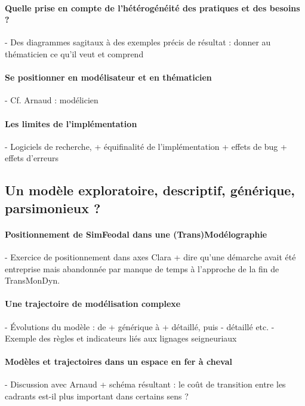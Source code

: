 \paragraph{Quelle prise en compte de l'hétérogénéité des pratiques et des besoins ?}

- Des diagrammes sagitaux à des exemples précis de résultat : donner au thématicien ce qu'il veut et comprend

\paragraph{Se positionner en modélisateur et en thématicien}

- Cf. Arnaud : modélicien

\paragraph{Les limites de l'implémentation}

- Logiciels de recherche, + équifinalité de l'implémentation + effets de bug + effets d'erreurs

\subsection{Un modèle exploratoire, descriptif, générique, parsimonieux ?}
\paragraph{Positionnement de SimFeodal dans une (Trans)Modélographie}

- Exercice de positionnement dans axes Clara + dire qu'une démarche avait été entreprise mais abandonnée par manque de temps à l'approche de la fin de TransMonDyn.

\paragraph{Une trajectoire de modélisation complexe }

- Évolutions du modèle : de + générique à + détaillé, puis - détaillé etc.
- Exemple des règles et indicateurs liés aux lignages seigneuriaux

\paragraph{Modèles et trajectoires dans un espace en \og fer à cheval\fg{}}

- Discussion avec Arnaud + schéma résultant : le coût de transition entre les cadrants est-il plus important dans certains sens ? 

